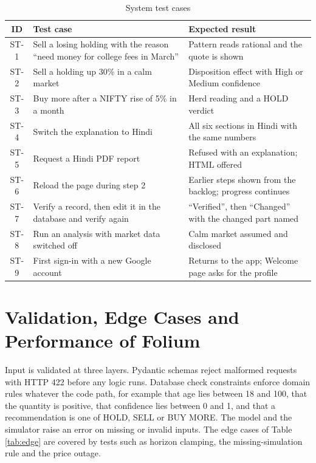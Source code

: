 \begin{table}[H]
\centering
\small
\begin{tabularx}{\textwidth}{|c|P{5.4cm}|L|}
\hline
\textbf{ID} & \textbf{Test case} & \textbf{Expected result} \\
\hline
ST-1 & Sell a losing holding with the reason ``need money for college fees in March'' & Pattern reads rational and the quote is shown \\
\hline
ST-2 & Sell a holding up 30\% in a calm market & Disposition effect with High or Medium confidence \\
\hline
ST-3 & Buy more after a NIFTY rise of 5\% in a month & Herd reading and a HOLD verdict \\
\hline
ST-4 & Switch the explanation to Hindi & All six sections in Hindi with the same numbers \\
\hline
ST-5 & Request a Hindi PDF report & Refused with an explanation; HTML offered \\
\hline
ST-6 & Reload the page during step 2 & Earlier steps shown from the backlog; progress continues \\
\hline
ST-7 & Verify a record, then edit it in the database and verify again & ``Verified'', then ``Changed'' with the changed part named \\
\hline
ST-8 & Run an analysis with market data switched off & Calm market assumed and disclosed \\
\hline
ST-9 & First sign-in with a new Google account & Returns to the app; Welcome page asks for the profile \\
\hline
\end{tabularx}
\caption{System test cases}
\label{tab:system}
\end{table}

\section{Validation, Edge Cases and Performance of Folium}
Input is validated at three layers. Pydantic schemas reject malformed requests with HTTP 422 before any logic runs. Database check constraints enforce domain rules whatever the code path, for example that age lies between 18 and 100, that the quantity is positive, that confidence lies between 0 and 1, and that a recommendation is one of HOLD, SELL or BUY MORE. The model and the simulator raise an error on missing or invalid inputs. The edge cases of Table \ref{tab:edge} are covered by tests such as horizon clamping, the missing-simulation rule and the price outage.

